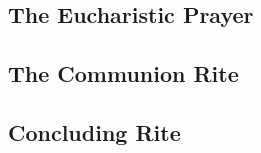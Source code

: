 \begin{english}
\subsection*{The Eucharistic Prayer}


\newpage \subsection*{The Communion Rite}


\newpage \subsection*{Concluding Rite}

\end{english}




